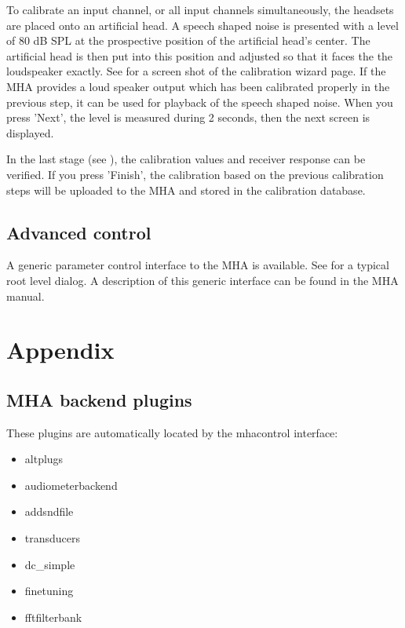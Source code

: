 \documentclass[11pt,a4paper,twoside]{article}
\newcommand{\+}{\discretionary{\mbox{\scriptsize$\hookleftarrow$}}{}{}}
\begin{document}

To calibrate an input channel, or all input channels simultaneously,
the headsets are placed onto an artificial head.
A speech shaped noise is presented with a level of 80
dB SPL at the prospective position of the artificial head's center.
The artificial head is then put into this position and adjusted so that it 
faces the the loudspeaker exactly. 
%
See  for a screen shot of the
calibration wizard page.
%
If the MHA provides a loud speaker output which has been
calibrated properly in the previous step, it can be used for playback
of the speech shaped noise.
%
When you press 'Next', the level is measured during 2 seconds, then
the next screen is displayed.


In the last stage (see ), the
calibration values and receiver response can be verified.
%
If you press 'Finish', the calibration based on the previous
calibration steps will be uploaded to the MHA and stored in the
calibration database.


\subsection{Advanced control}\label{sec:advanced}

A generic parameter control interface to the MHA is available. See
 for a typical root level dialog.
%
A description of this generic interface can be found in the MHA
manual.


\section{Appendix}

\subsection{MHA backend plugins}

These plugins are automatically located by the mhacontrol interface:
%
\begin{itemize}
\item altplugs
\item audiometerbackend
\item addsndfile
\item transducers
\item dc\_simple
\item finetuning
\item fftfilterbank
\end{itemize}



\printindex
\end{document}
